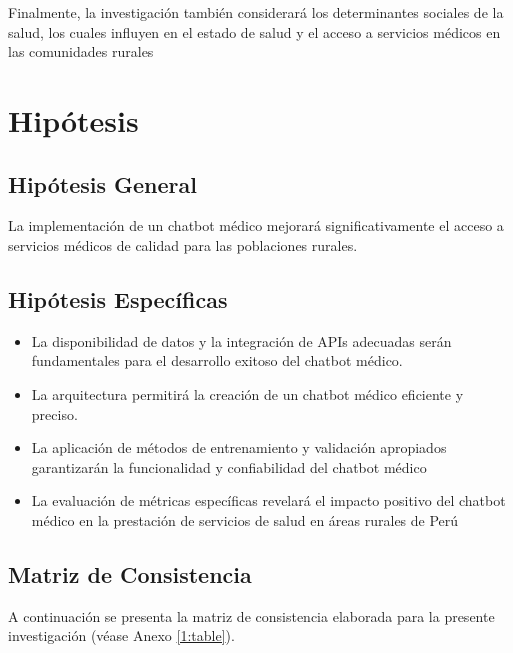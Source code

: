 Finalmente, la investigación también considerará los determinantes sociales de la salud, los cuales influyen en el estado de salud y el acceso a servicios médicos en las comunidades rurales

\section{Hipótesis}

\subsection{Hipótesis General}
\newcommand{\HipotesisGeneral}{
La implementación de un chatbot médico mejorará significativamente el acceso a servicios médicos de calidad para las poblaciones rurales.
}
\HipotesisGeneral
\subsection{Hipótesis Específicas}
\newcommand{\Hone}{
La disponibilidad de datos y la integración de APIs adecuadas serán fundamentales para el desarrollo exitoso del chatbot médico.
}
\newcommand{\Htwo}{
La arquitectura permitirá la creación de un chatbot médico eficiente y preciso.
}
\newcommand{\Hthree}{
La aplicación de métodos de entrenamiento y validación apropiados garantizarán la funcionalidad y confiabilidad del chatbot médico
}
\newcommand{\Hfour}{
La evaluación de métricas específicas revelará el impacto positivo del chatbot médico en la prestación de servicios de salud en áreas rurales de Perú
}
\begin{itemize}
	\item \Hone
	\item \Htwo
	\item \Hthree
	\item \Hfour

\end{itemize}

\subsection{Matriz de Consistencia}
A continuación se presenta la matriz de consistencia elaborada para la presente investigación (véase Anexo \ref{1:table}).


